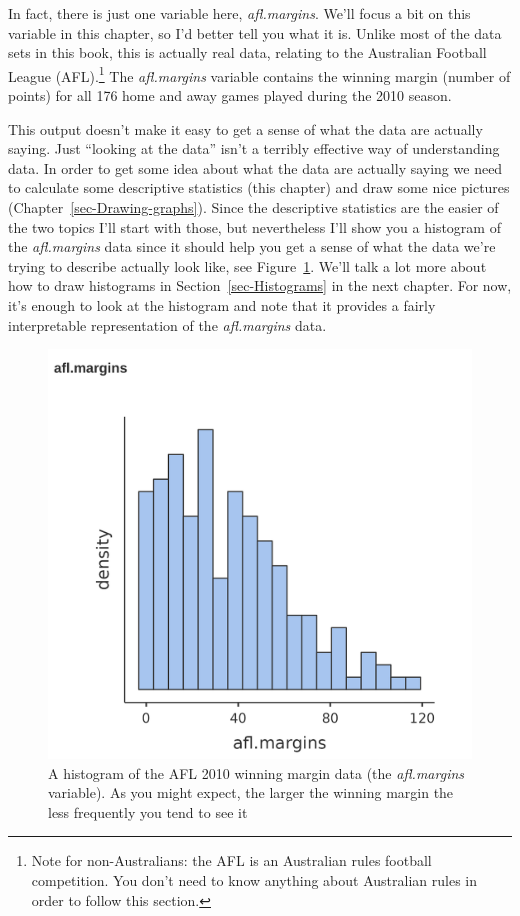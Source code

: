 \documentclass[
  a4paper,
]{book}
\begin{document}
In fact, there is just one variable here, \emph{afl.margins}. We'll
focus a bit on this variable in this chapter, so I'd better tell you
what it is. Unlike most of the data sets in this book, this is actually
real data, relating to the Australian Football League (AFL).\footnote{Note
  for non-Australians: the AFL is an Australian rules football
  competition. You don't need to know anything about Australian rules in
  order to follow this section.} The \emph{afl.margins} variable
contains the winning margin (number of points) for all 176 home and away
games played during the 2010 season.

This output doesn't make it easy to get a sense of what the data are
actually saying. Just ``looking at the data'' isn't a terribly effective
way of understanding data. In order to get some idea about what the data
are actually saying we need to calculate some descriptive statistics
(this chapter) and draw some nice pictures
(Chapter~\ref{sec-Drawing-graphs}). Since the descriptive statistics are
the easier of the two topics I'll start with those, but nevertheless
I'll show you a histogram of the \emph{afl.margins} data since it should
help you get a sense of what the data we're trying to describe actually
look like, see Figure~\ref{fig-fig4-2}. We'll talk a lot more about how
to draw histograms in Section~\ref{sec-Histograms} in the next chapter.
For now, it's enough to look at the histogram and note that it provides
a fairly interpretable representation of the \emph{afl.margins} data.

\begin{figure}

\includegraphics[width=1\textwidth,height=\textheight]{images/fig4-2.png} \hfill{}

\caption{\label{fig-fig4-2}A histogram of the AFL 2010 winning margin
data (the \emph{afl.margins} variable). As you might expect, the larger
the winning margin the less frequently you tend to see it}

\end{figure}
\end{document}
